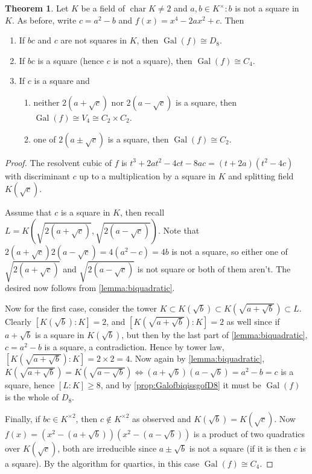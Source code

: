 \documentclass{article}
\newcommand{\Char}{\operatorname{char}}
\newcommand{\Gal}{\operatorname{Gal}}
\theoremstyle{definition}
\newtheorem{thm}[defn]{Theorem}
\begin{document}
\begin{thm}
Let $K$ be a field of $\Char K\neq 2$ and $a,b\in K^\times:b$ is not a square in $K$. As before, write $c=a^2-b$ and $f(x)=x^4-2ax^2+c$. Then
\begin{enumerate}
\item If $bc$ and $c$ are not squares in $K$, then $\Gal(f)\cong D_8$.
\item If $bc$ is a square (hence $c$ is not a square), then $\Gal(f)\cong C_4$.
\item If $c$ is a square and
\begin{enumerate}
\item neither $2\left(a+\sqrt c\right)$ nor $2\left(a-\sqrt c\right)$ is a square, then $\Gal(f)\cong V_4\cong C_2\times C_2$.
\item one of $2\left(a\pm\sqrt c\right)$ is a square, then $\Gal(f)\cong C_2$.
\end{enumerate}
\end{enumerate}
\end{thm}
\begin{proof}
The resolvent cubic of $f$ is $t^3+2at^2-4ct-8ac=(t+2a)(t^2-4c)$ with discriminant $c$ up to a multiplication by a square in $K$ and splitting field $K\left(\sqrt c\right)$.

Assume that $c$ is a square in $K$, then recall $L=K\left(\sqrt{2\left(a+\sqrt c\right)},\sqrt{2\left(a-\sqrt c\right)}\right)$. Note that $2\left(a+\sqrt c\right)2\left(a-\sqrt c\right)=4(a^2-c)=4b$ is not a square, so either one of $\sqrt{2\left(a+\sqrt c\right)}$ and $\sqrt{2\left(a-\sqrt c\right)}$ is not square or both of them aren't. The desired now follows from \ref{lemma:biquadratic}.

Now for the first case, consider the tower $K\subset K\left(\sqrt b\right)\subset K\left(\sqrt{a+\sqrt b}\right)\subset L$. Clearly $\left[K\left(\sqrt b\right):K\right]=2$, and $\left[K\left(\sqrt{a+\sqrt b}\right):K\right]=2$ as well since if $a+\sqrt b$ is a square in $K\left(\sqrt b\right)$, but then by the last part of \ref{lemma:biquadratic}, $c=a^2-b$ is a square, a contradiction. Hence by tower law, $\left[K\left(\sqrt{a+\sqrt b}\right):K\right]=2\times 2=4$. Now again by \ref{lemma:biquadratic}, $K\left(\sqrt{a+\sqrt b}\right)=K\left(\sqrt{a-\sqrt b}\right)\iff \left(a+\sqrt b\right)\left(a-\sqrt b\right)=a^2-b=c$ is a square, hence $[L:K]\geq 8$, and by \ref{prop:GalofbiqissgofD8} it must be $\Gal(f)$ is the whole of $D_8$.

Finally, if $bc\in K^{\times 2}$, then $c\notin K^{\times 2}$ as observed and $K\left(\sqrt b\right)=K\left(\sqrt c\right)$. Now $f(x)=\left(x^2-\left(a+\sqrt b\right)\right)\left(x^2-\left(a-\sqrt b\right)\right)$ is a product of two quadratics over $K\left(\sqrt c\right)$, both are irreducible since $a\pm\sqrt b$ is not a square (if it is then $c$ is a square). By the algorithm for quartics, in this case $\Gal(f)\cong C_4$.
\end{proof}
\end{document}
